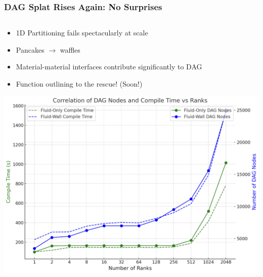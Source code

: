 \begin{frame}\frametitle{DAG Splat Rises Again: No Surprises}
    \begin{columns}[T]  %
    \begin{column}{0.5\textwidth}
      \begin{itemize}
      \item 1D Partitioning fails spectacularly at scale
      \item Pancakes $\rightarrow$ waffles
      \item Material-material interfaces contribute significantly to DAG
      \item Function outlining to the rescue!  (Soon!)
      \end{itemize}
      \vspace{20pt}
      \hspace{20pt}
      \includegraphics[width=.7\textwidth]{Figures/mtc/compile_times_dag_nodes.png}
    \end{column}
    

\end{columns}
\end{frame}
